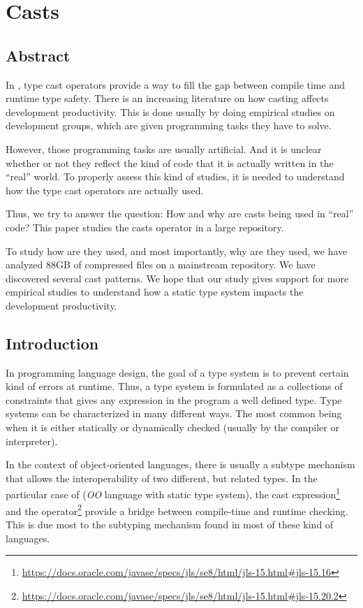 \chapter{Casts}

\section{Abstract}

In \java, type cast operators provide a way to fill the gap between compile time and runtime type safety. 
There is an increasing literature on how casting affects development productivity. 
This is done usually by doing empirical studies on development groups, which are given programming tasks they have to solve. 

However, those programming tasks are usually artificial. 
And it is unclear whether or not they reflect the kind of code that it is actually written in the ``real'' world. 
To properly assess this kind of studies, it is needed to understand how the type cast operators are actually used. 

Thus, we try to answer the question: 
How and why are casts being used in ``real'' \java{} code? 
This paper studies the casts operator in a large \java{} repository. 

To study how are they used, and most importantly, why are they used, we have analyzed 88GB of compressed \jar{} files on a mainstream \java{} repository. 
We have discovered several cast patterns. 
We hope that our study gives support for more empirical studies to understand how a static type system impacts the development productivity.

\section{Introduction}
\label{sec:orgd1d4548}
In programming language design, the goal of a type system is to prevent certain kind of errors at runtime. 
Thus, a type system is formulated as a collections of constraints that gives any expression in the program a well defined type. 
Type systems can be characterized in many different ways. 
The most common being when it is either statically or dynamically checked (usually by the compiler or interpreter). 

In the context of object-oriented languages, there is usually a subtype mechanism that allows the interoperability of two different, but related types. 
In the particular case of \java{} (\emph{OO} language with static type system), the cast expression\footnote{\url{https://docs.oracle.com/javase/specs/jls/se8/html/jls-15.html\#jls-15.16}} and the \instanceof{} operator\footnote{\url{https://docs.oracle.com/javase/specs/jls/se8/html/jls-15.html\#jls-15.20.2}} provide a bridge between compile-time and runtime checking. 
This is due most to the subtyping mechanism found in most of these kind of languages. 

